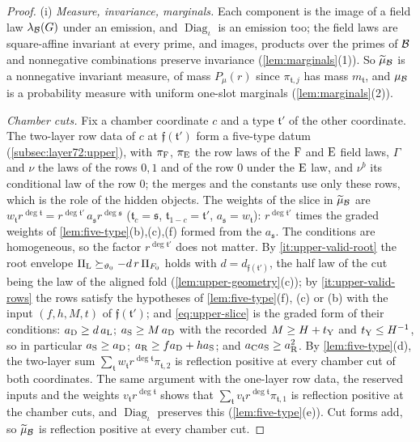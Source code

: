 \begin{proof}
(i) \emph{Measure, invariance, marginals.} Each component is the image of a field law
$\lambda_\mathcal B(G)$ under an emission, and $\operatorname{Diag}_\iota$ is an emission
too; the field laws are square-affine invariant at every prime, and images, products
over the primes of $\mathcal B$ and nonnegative combinations preserve invariance
(\cref{lem:marginals}(1)). So $\widetilde\mu_\mathcal B$ is a nonnegative invariant measure,
of mass $P_\mu(r)$ since $\pi_{\mathfrak t,j}$ has mass $m_{\mathfrak t}$, and $\mu_\mathcal B$
is a probability measure with uniform one-slot marginals (\cref{lem:marginals}(2)).

\emph{Chamber cuts.} Fix a chamber coordinate $c$ and a type $\mathfrak t'$ of the other
coordinate. The two-layer row data of $c$ at $\mathfrak f(\mathfrak t')$ form a five-type datum
(\cref{subsec:layer72:upper}), with $\pi_{\rm F}$, $\pi_{\rm E}$ the row laws of the
$\rm F$ and $\rm E$ field laws, $\Gamma$ and $\nu$ the laws of the rows $0,1$ and of the
row $0$ under the $\rm E$ law, and $\nu^b$ its conditional law of the row $0$; the merges
and the constants use only these rows, which is the role of the hidden objects. The
weights of the slice in $\widetilde\mu_\mathcal B$ are $w_{\mathfrak t}r^{\deg\mathfrak t}=
r^{\deg\mathfrak t'}\,a_{\mathfrak s}r^{\deg\mathfrak s}$ ($\mathfrak t_c=\mathfrak s$, $\mathfrak t_{1-c}=\mathfrak t'$,
$a_{\mathfrak s}=w_{\mathfrak t}$): $r^{\deg\mathfrak t'}$ times the graded weights of
\cref{lem:five-type}(b),(c),(f) formed from the $a_{\mathfrak s}$. The conditions are homogeneous,
so the factor $r^{\deg\mathfrak t'}$ does not matter. By
\ref{it:upper-valid-root} the root envelope $\Pi_{\rm L}\succeq_{\vartheta_0}
-d\,r\,\Pi_{F_0}$ holds with $d=d_{\mathfrak f(\mathfrak t')}$, the half law of the cut being
the law of the aligned fold (\cref{lem:upper-geometry}(c)); by \ref{it:upper-valid-rows}
the rows satisfy the hypotheses of \cref{lem:five-type}(f), (c) or (b) with the input
$(f,h,M,t)$ of $\mathfrak f(\mathfrak t')$; and \eqref{eq:upper-slice} is the graded form of
their conditions: $a_{\rm D}\ge d\,a_{\rm L}$; $a_{\rm S}\ge M\,a_{\rm D}$ with the recorded
$M\ge H+t_{\rm Y}$ and $t_{\rm Y}\le H^{-1}$, so in particular $a_{\rm S}\ge a_{\rm D}$;
$a_{\rm R}\ge fa_{\rm D}+ha_{\rm S}$; and $a_{\rm C}a_{\rm S}\ge a_{\rm R}^2$.
By \cref{lem:five-type}(d), the two-layer sum $\sum_{\mathfrak t}w_{\mathfrak t}
r^{\deg\mathfrak t}\pi_{\mathfrak t,2}$ is reflection positive at every chamber cut of
both coordinates. The same argument with the one-layer row data, the reserved inputs
and the weights $v_{\mathfrak t}r^{\deg\mathfrak t}$ shows that $\sum_{\mathfrak t}
v_{\mathfrak t}r^{\deg\mathfrak t}\pi_{\mathfrak t,1}$ is reflection positive at the chamber
cuts, and $\operatorname{Diag}_\iota$ preserves this (\cref{lem:five-type}(e)). Cut forms
add, so $\widetilde\mu_\mathcal B$ is reflection positive at every chamber cut.


\end{proof}
